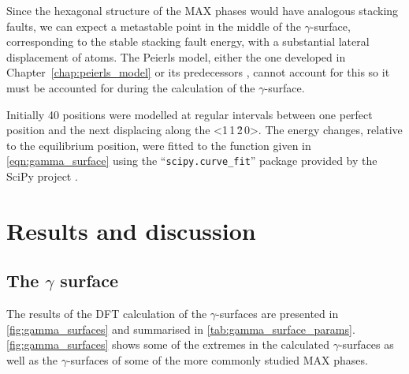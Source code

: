 Since the hexagonal structure of the MAX phases would have analogous stacking faults, we can expect a metastable point in the middle of the $\gamma$-surface, corresponding to the stable stacking fault energy, with a substantial lateral displacement of atoms. The Peierls model, either the one developed in Chapter~\ref{chap:peierls_model} or its predecessors \cite{Clegg2006, Howie2017}, cannot account for this so it must be accounted for during the calculation of the $\gamma$-surface.

Initially 40 positions were modelled at regular intervals between one perfect position and the next displacing along the <1\,1\,\={2}\,0>. The energy changes, relative to the equilibrium position, were fitted to the function given in \autoref{eqn:gamma_surface} using the ``\texttt{scipy.curve\_fit}'' package provided by the SciPy project \cite{SciPy2001}.





\section{Results and discussion}

\subsection{The \texorpdfstring{$\gamma$}{gamma} surface}
The results of the DFT calculation of the $\gamma$-surfaces are presented in \autoref{fig:gamma_surfaces} and summarised in \autoref{tab:gamma_surface_params}. \autoref{fig:gamma_surfaces} shows some of the extremes in the calculated $\gamma$-surfaces as well as the $\gamma$-surfaces of some of the more commonly studied MAX phases. 



